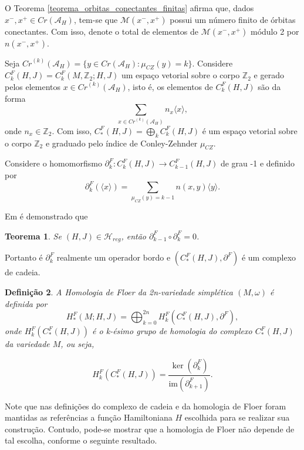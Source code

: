 \documentclass[12pt]{book}
\newtheorem{teorema}{Teorema}[section]
\newtheorem{definicao}[teorema]{Definição}
\newcommand{\bordo}[1]{\partial_{#1}}
\newcommand{\energiafinitaM}{\mathcal{M}}
\newcommand{\energiafinitaMconectante}{\energiafinitaM(x^{-}, x^{+})}
\newcommand{\funcionalH}{\mathcal{A}_{H}}
\newcommand{\gerador}[1]{\langle #1\rangle}
\newcommand{\hamiltonianasRegulares}{\mathcal{H}_{reg}}
\newcommand{\iconley}[1]{\iconleyabrev(#1)}
\newcommand{\iconleyabrev}{\mu_{CZ}}
\newcommand{\inteiros}{\mathbb{Z}}
\newcommand{\pontoscriticos}[1]{\textit{Cr}(#1)}
\newcommand{\pontoscriticosordem}[2]{\textit{Cr}^{(#1)}(#2)}
\begin{document}
	O Teorema \ref{teorema_orbitas_conectantes_finitas} afirma que, dados $x^{-},x^{+} \in \pontoscriticos{\funcionalH}$, tem-se que $\energiafinitaMconectante$ possui um número finito de órbitas conectantes. Com isso, denote o total de elementos de $\energiafinitaMconectante$ módulo 2 por $n(x^{-},x^{+})$.
	
	 Seja $\pontoscriticosordem{k}{\funcionalH} = \{ y \in \pontoscriticos{\funcionalH}: \iconley{y}=k\}$. Considere $C^{F}_{k}(H,J)=C^{F}_{k}(M, \inteiros_{2}; H,J)$ um espaço vetorial sobre o corpo $\inteiros_{2}$ e gerado pelos elementos $x \in \pontoscriticosordem{k}{\funcionalH} $, isto é, os elementos de $C^{F}_{k}(H,J)$ são da forma
	$$
		\sum_{x\in \pontoscriticosordem{k}{\funcionalH} }n_{x}\gerador{x},
	$$
	onde $n_{x}\in \inteiros_{2}$. Com isso, $C^{F}_{*}(H,J)=\bigoplus_{k}C^{F}_{k}(H,J)$ é um espaço vetorial sobre o corpo $\inteiros_{2}$ e graduado pelo índice de Conley-Zehnder $\iconleyabrev$.

	Considere o homomorfismo $\bordo{k}^{F}: C^{F}_{k}(H,J)\to C^{F}_{k-1}(H,J)$ de grau -1 e definido por
	$$
	\bordo{k}^{F}(\gerador{x}) = \sum_{\iconley{y}=k-1}n(x,y)\gerador{y}.
	$$
	
	Em \cite{audi_floer_homology} é demonstrado que 
	
	\begin{teorema}
		Se $(H,J)\in \hamiltonianasRegulares$, então $\partial^{F}_{k-1}\circ \partial^{F}_{k} = 0$.
	\end{teorema}
	
	Portanto é $\partial^{F}_{k}$ realmente um operador bordo e $(C^{F}_{*}(H,J), \partial^{F})$ é um complexo de cadeia.
	
	\begin{definicao}
			A Homologia de Floer da 2n-variedade simplética $(M,\omega)$ é definida por 
			$$
			H^{F}_{*}(M;H,J)=\bigoplus_{k=0}^{2n}H^{F}_{k}(C^{F}_{*}(H,J), \partial^{F}),
			$$
			onde $H^{F}_{k}(C^{F}_{*}(H,J))$ é o k-ésimo grupo de homologia do complexo $C^{F}_{*}(H,J)$ da variedade $M$, ou seja,
			
			$$
			H^{F}_{k}(C^{F}_{*}(H,J)) = \frac{\ker(\partial^{F}_{k})}{\text{im}(\partial^{F}_{k+1})}.
			$$ 
	\end{definicao}
	
	Note que nas definições do complexo de cadeia e da homologia de Floer foram mantidas as referências a função Hamiltoniana $H$ escolhida para se realizar sua construção. Contudo,  pode-se mostrar que a homologia de Floer não depende de tal escolha, conforme o seguinte resultado.
	
\end{document}

